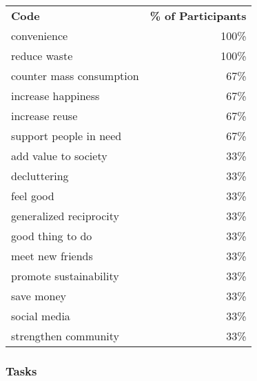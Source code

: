 \begin{longtable}{p{}r}
\textbf{Code}            & \textbf{\% of Participants} \\
convenience              & 100\%                       \\
reduce waste             & 100\%                       \\
counter mass consumption & 67\%                        \\
increase happiness       & 67\%                        \\
increase reuse           & 67\%                        \\
support people in need   & 67\%                        \\
add value to society     & 33\%                        \\
decluttering             & 33\%                        \\
feel good                & 33\%                        \\
generalized reciprocity  & 33\%                        \\
good thing to do         & 33\%                        \\
meet new friends         & 33\%                        \\
promote sustainability   & 33\%                        \\
save money               & 33\%                        \\
social media             & 33\%                        \\
strengthen community     & 33\%
\end{longtable}

\subsubsection*{Tasks}

